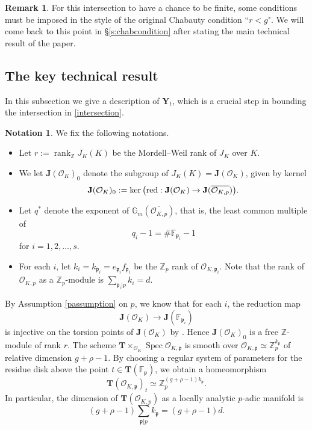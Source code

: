 \documentclass[11pt,oneside]{amsart}
\theoremstyle{plain}
\theoremstyle{definition}
\newtheorem{remark}[theorem]{Remark}
\newtheorem{notation}[theorem]{Notation}
\def\G{{\bf G}}
\DeclareMathOperator{\spec}{Spec} \DeclareMathOperator{\sgn}{sign}
\DeclareMathOperator{\rank}{rank} \DeclareMathOperator{\rig}{rig}
\def\TT{\mathbf{T}}
\def\Z{\mathbb{Z}}
\def\F{\mathbb{F}}
\def\J{\mathbf{J}}
\def\G{\mathbb{G}}
\def\Y{\mathbf{Y}}
\def\oh{\mathcal{O}}
\begin{document}
\begin{remark}
    For this intersection to have a chance to be finite, some conditions must be imposed in the style of the original Chabauty condition  ``$r<g$". We will come back to this point in \S \ref{s:chabcondition} after stating the main technical result of the paper. 
\end{remark}


\subsection{The key technical result}\label{s:strategy} 

In this subsection we give a description of $\Y_t$, which is a crucial step in bounding the intersection in \ref{intersection}. 
\begin{notation} \label{notation:main_thm_sec} We fix the following notations. 
\begin{itemize} 
\item Let $r:=\rank_\Z J_K(K)$ be the Mordell--Weil rank of $J_K$ over $K$. 
\item  %
We let $\J(\oh_K)_0$ denote the subgroup of $J_K(K) = \J(\oh_K)$, given by kernel 
$$ \J(\oh_K)_0 := \ker \big( \textup{red}: \J(\oh_K) \rightarrow \J(\overline{\oh_{K, p}}) \big).$$ 
\item 
Let $q^*$ denote the exponent of $\G_m(\overline{\oh_{K, p}})$, that is, the least common multiple of $$q_i-1=\# \mathbb{F}_{\mathfrak{p}_i}-1$$ for $i=1, 2, \ldots, s$.
\item 
For each $i$, let $k_i = k_{\mathfrak{p}_i}=e_{\mathfrak{p}_i}f_{\mathfrak{p}_i}$ be the $\Z_p$ rank of $\oh_{K, \mathfrak{p}_i}$. Note that the rank of $\oh_{K, p}$ as a $\Z_p$-module is $\sum_{\mathfrak{p_i}\vert p} k_i =d$. 
\end{itemize}
\end{notation}


 By Assumption \ref{passumption} on $p$, we know that for each $i$, the reduction map 
$$\J(\oh_K)\rightarrow \J(\F_{\mathfrak{p}_i})$$ is injective on the torsion points of $\J(\oh_K)$ by \cite[Appendix]{katz1980galois}. Hence $\J(\oh_K)_0$ is a free $\Z$-module of rank $r$. The scheme $\TT\times_{\oh_K} \spec \oh_{K, \mathfrak{p}}$ is smooth over $\oh_{K, \mathfrak{p}}\simeq \Z_p^{k_{\mathfrak{p}}}$ of relative dimension $g+\rho-1$. By choosing a regular system of parameters for the residue disk above the point $t\in \TT(\F_\mathfrak{p})$, we obtain a homeomorphism 
$$\TT(\oh_{K, \mathfrak{p}})_t\simeq \Z_p^{(g+\rho-1)k_{\mathfrak{p}}}.$$ In particular, the dimension of $\TT(\oh_{K, p})$ as a locally analytic $p$-adic manifold is $$(g+\rho-1)\sum_{\mathfrak{p}\vert p} k_{\mathfrak{p}}=(g+\rho-1)d.$$ 
\end{document}
